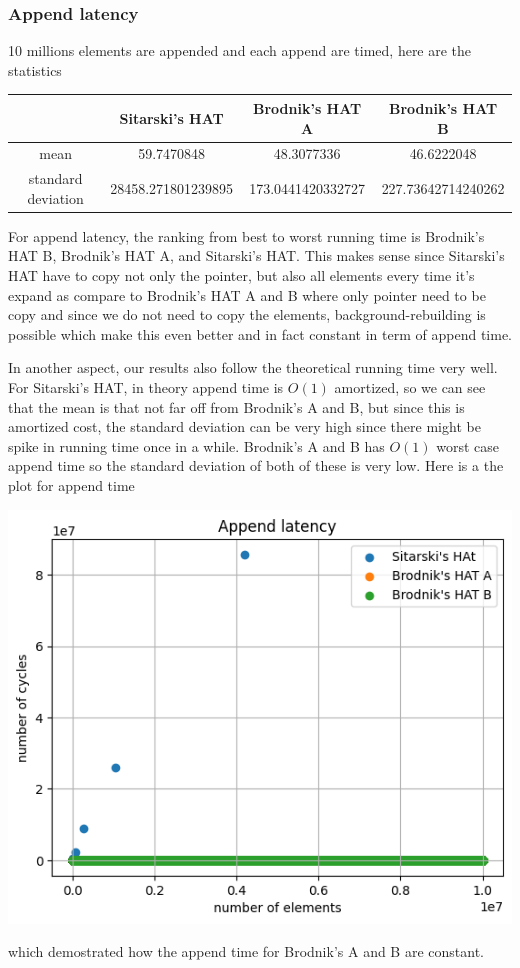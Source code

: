 \documentclass{article} %
\begin{document}
    \subsubsection*{Append latency}
    10 millions elements are appended and each append are timed, here are the statistics
    \begin{center}
        \begin{tabular}{|c|c|c|c|}\hline
        & Sitarski's HAT & Brodnik's HAT A & Brodnik's HAT B\\\hline
        mean &  59.7470848 & 48.3077336 & 46.6222048\\\hline
        standard deviation & 28458.271801239895  & 173.0441420332727 & 227.73642714240262\\\hline
        \end{tabular}
    \end{center}
    For append latency, the ranking from best to worst running time is Brodnik's HAT B, Brodnik's HAT A, and Sitarski's HAT.
    This makes sense since Sitarski's HAT have to copy not only the pointer, but also all elements every time it's expand as compare to Brodnik's HAT A
    and B where only pointer need to be copy and since we do not need to copy the elements, background-rebuilding is possible which make this even better and in fact constant in term of append time.

    In another aspect, our results also follow the theoretical running time very well. For Sitarski's HAT, in theory append time is $O(1)$ amortized, so we can see that the mean
    is that not far off from Brodnik's A and B, but since this is amortized cost, the standard deviation can be very high since there might be spike in running time once in a while. Brodnik's A and B has $O(1)$ worst case append time so
    the standard deviation of both of these is very low. Here is a the plot for append time
    \begin{center}
        \includegraphics{graphics/hat_append.png}
    \end{center}
    which demostrated how the append time for Brodnik's A and B are constant.
\end{document}
